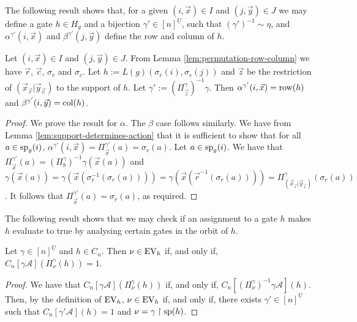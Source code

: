 \documentclass[../paper.tex]{subfiles}
\begin{document}
The following result shows that, for a given $(i, \vec{x}) \in I$ and $(j,
\vec{y}) \in J$ we may define a gate $h \in H_g$ and a bijection $\gamma' \in
[n]^{\underline{U}}$, such that $(\gamma')^{-1} \sim \eta$, and
$\alpha^{\gamma'}(i, \vec{x})$ and $\beta^{\gamma'}(j, \vec{y})$ define the row
and column of $h$.

\begin{lem}
  \label{lem:defining-h-from-IJ}
  Let $(i, \vec{x}) \in I$ and $(j, \vec{y}) \in J$. From Lemma
  \ref{lem:permutation-row-column} we have $\vec{r}$, $\vec{c}$, $\sigma_r$ and
  $\sigma_c$. Let $h := L(g) (\sigma_r (i), \sigma_c (j))$ and $\vec{z}$ be the
  restriction of $(\vec{x}_{\vec{r}} \vert \vec{y}_{\vec{c}})$ to the support of
  $h$. Let $\gamma' := (\Pi^{\gamma}_{\vec{z}})^{-1} \gamma$. Then
  $\alpha^{\gamma'} (i, \vec{x}) = \text{row} (h)$ and $\beta^{\gamma'} (i,\vec{y}) =
  \text{col}(h)$.
\end{lem}
\begin{proof}
  We prove the result for $\alpha$. The $\beta$ case follows similarly. We have
  from Lemma \ref{lem:support-determines-action} that it is sufficient to show
  that for all $a \in \text{sp}_g(i)$, $\alpha^{\gamma'}(i, \vec{x}) =
  \Pi^{\gamma'}_{\vec{x}} (a) = \sigma_r (a)$. Let $a \in \text{sp}_g(i)$. We have
  that $\Pi^{\gamma'}_{\vec{x}} (a) = (\Pi^{\gamma}_{b})^{-1} \gamma (\vec{x}
  (a))$ and $\gamma (\vec{x}(a)) = \gamma (\vec{x} (\sigma^{-1}_r(\sigma_r(a))))
  = \gamma (\vec{x} (\vec{r}^{-1} (\sigma_r(a)))) =
  \Pi^{\gamma}_{(\vec{x}_{\vec{r}} \vert \vec{y}_{\vec{c}})}(\sigma_r(a))$. It
  follows that $\Pi^{\gamma'}_{\vec{x}}(a) = \sigma_r(a)$, as required.
\end{proof}

The following result shows that we may check if an assignment to a gate $h$
makes $h$ evaluate to true by analysing certain gates in the orbit of $h$.

\begin{lem}
  Let $\gamma\in [n]^{\underline{U}}$ and $h \in C_n$. Then $\nu \in \text{EV}_h$ if,
  and only if, $C_n[\gamma \mathcal{A}](\Pi^{\gamma}_\nu (h)) = 1$.
  \label{lem:translate-EV-circuits}
\end{lem}
\begin{proof}
  We have that $C_n[\gamma \mathcal{A}](\Pi^{\gamma}_\nu(h))$ if, and only if,
  $C_n[(\Pi^{\gamma}_{\nu})^{-1}\gamma \mathcal{A}] (h)$. Then, by the
  definition of $\text{EV}_h$, $\nu \in \text{EV}_h$ if, and only if, there exists $\gamma'
  \in [n]^{\underline{U}}$ such that $C_n[\gamma' \mathcal{A}](h) = 1$ and $\nu
  = \gamma\restriction{\text{sp}(h)}$.
\end{proof}
\end{document}
